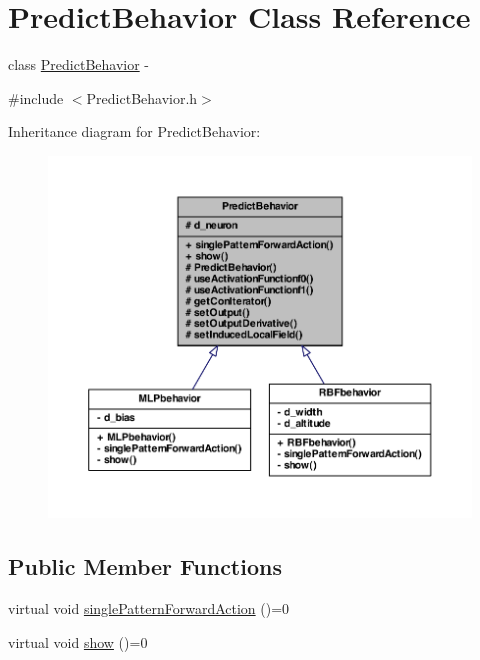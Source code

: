 \hypertarget{class_predict_behavior}{
\section{PredictBehavior Class Reference}
\label{class_predict_behavior}
}


class \hyperlink{class_predict_behavior}{PredictBehavior} -\/  




{\ttfamily \#include $<$PredictBehavior.h$>$}



Inheritance diagram for PredictBehavior:
\nopagebreak
\begin{figure}[H]
\begin{center}
\leavevmode
\includegraphics[width=400pt]{class_predict_behavior__inherit__graph}
\end{center}
\end{figure}
\subsection*{Public Member Functions}
\begin{DoxyCompactItemize}
\item 
virtual void \hyperlink{class_predict_behavior_a13d82e6ee45b4fa1b7e17941f990fdc5}{singlePatternForwardAction} ()=0
\item 
virtual void \hyperlink{class_predict_behavior_a9ef84360f73784248d994fa4707c1dde}{show} ()=0
\end{DoxyCompactItemize}
